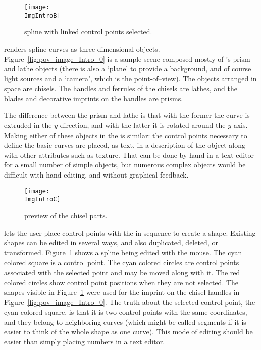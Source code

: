 \begin{figure}[htb]
\centering
\texttt{[image: \\ImgIntroB]}
\caption{\dtybeznu{} spline with linked control points selected.}
\label{fig:bezier_linked_control_points}
\end{figure}

\IXpov{} renders spline curves as three dimensional objects.
Figure~\ref{fig:pov_image_Intro_0} is a sample scene
composed mostly of \IXpov's prism and lathe objects
(there is also a `plane' to provide a background, and of course
light sources and a `camera', which is the point-of--view).
The objects arranged in space
are chisels. The handles and ferrules of the chisels are
\IXpov{} lathes, and the blades and decorative imprints
on the handles are prisms.

The difference between the prism and lathe is that
with the former the curve is extruded in the $y$-direction,
and with the latter it is rotated around the $y$-axis.
Making either of these objects in the \IXpov{} 
is similar: the control points necessary to define the
basic curves are placed, as text, in a description of
the object along with other attributes such as texture.
That can be done by hand in a text editor for a small
number of simple objects, but numerous complex objects
would be difficult with hand editing, and
without graphical feedback.

\begin{figure}[htb]
\centering
\texttt{[image: \\ImgIntroC]}
\caption{\dtypov{} preview of the chisel parts.}
\label{fig:chisel_edit_preview_1}
\end{figure}

\IXpkgu{} lets the user place control points with the
 in sequence to create a shape.
Existing shapes can be edited in several ways, and also
duplicated, deleted, or transformed.
Figure~\ref{fig:bezier_linked_control_points}
shows a \IXarg{\dtybezil} spline being edited with the mouse.
The cyan colored square is a  control
point. The cyan colored circles are control points
associated with the selected point and may be moved along with
it. The red colored circles show control point
positions when they are not selected. The shapes visible
in Figure~\ref{fig:bezier_linked_control_points} were
used for the imprint on the chisel handles in
Figure~\ref{fig:pov_image_Intro_0}. The truth about
the selected control point, the cyan colored square, is
that it is two control points with the same coordinates,
and they belong to neighboring curves (which might be
called segments if it is easier to think of the whole
shape as one curve). This mode of editing should be easier
than simply placing numbers in a text editor.

